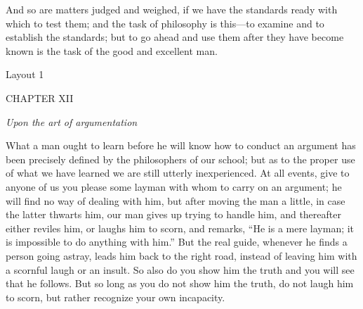 And so are matters judged and weighed, if we have the standards ready with which to test them; and the task of philosophy is this—to examine and to establish the standards; but to go ahead and use them after they have become known is the task of the good and excellent man.



Layout 1

CHAPTER XII

\emph{Upon the art of argumentation}

What a man ought to learn before he will know how to conduct an argument has been precisely defined by the philosophers of our school; but as to the proper use of what we have learned we are still utterly inexperienced. At all events, give to anyone of us you please some layman with whom to carry on an argument; he will find no way of dealing with him, but after moving the man a little, in case the latter thwarts him, our man gives up trying to handle him, and thereafter either reviles him, or laughs him to scorn, and remarks, ``He is a mere layman; it is impossible to do anything with him.'' But the real guide, whenever he finds a person going astray, leads him back to the right road, instead of leaving him with a scornful laugh or an insult. So also do you show him the truth and you will see that he follows. But so long as you do not show him the truth, do not laugh him to scorn, but rather recognize your own incapacity.

